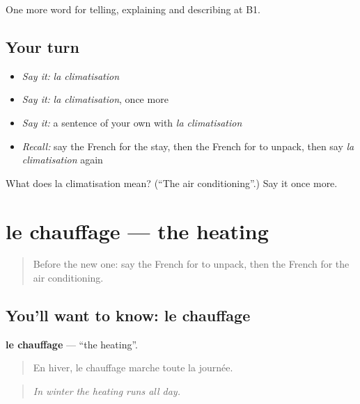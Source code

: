 \begin{grammarlens}[title={What you've built}]
One more word for telling, explaining and describing at B1.
\end{grammarlens}

\subsection*{Your turn}
\begin{itemize}
\raggedright
  \item \emph{Say it:} \emph{la climatisation}
  \item \emph{Say it:} \emph{la climatisation}, once more
  \item \emph{Say it:} a sentence of your own with \emph{la climatisation}
  \item \emph{Recall:} say the French for the stay, then the French for to unpack, then say \emph{la climatisation} again
\end{itemize}

\begin{tcolorbox}[breakable,colback=teal!4,colframe=teal!35!black,title={Before you move on}]
What does la climatisation mean? (\textquotedblleft{}The air conditioning\textquotedblright{}.) Say it once more.
\end{tcolorbox}
\section[le chauffage]{le chauffage — the heating}

\label{lesson:FR-C427-chauffage}



\begin{quote}
Before the new one: say the French for to unpack, then the French for the air conditioning.
\end{quote}

\subsection*{You'll want to know: le chauffage}
\textbf{le chauffage} — \textquotedblleft{}the heating\textquotedblright{}.

\begin{quote}
En hiver, le chauffage marche toute la journée.
\end{quote}

\begin{quote}
\emph{In winter the heating runs all day.}
\end{quote}

